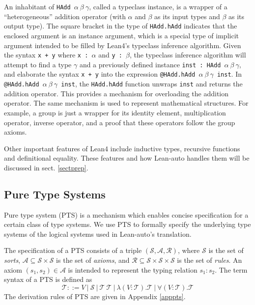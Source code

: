   \noindent An inhabitant of \texttt{HAdd $\alpha \ \beta \ \gamma$}, called a
  typeclass instance, is a wrapper of a ``heterogeneous'' addition operator (with $\alpha$ and $\beta$ as its input types and
  $\beta$ as its output type). The square bracket in the type of \texttt{HAdd.hAdd}
  indicates that the enclosed argument is an instance argument, which is a special type
  of implicit argument intended to be filled by Lean4's typeclass inference algorithm.
  Given the syntax \texttt{x + y} where \texttt{x : $\alpha$} and \texttt{y : $\beta$},
  the typeclass inference algorithm will attempt to find a type $\gamma$ and a previously
  defined instance \texttt{inst : HAdd $\alpha \ \beta \ \gamma$}, and elaborate the
  syntax \texttt{x + y} into the expression \texttt{@HAdd.hAdd $\alpha \ \beta \ \gamma$ inst}.
  In \texttt{@HAdd.hAdd $\alpha \ \beta \ \gamma$ inst}, the \texttt{HAdd.hAdd} function
  unwraps \texttt{inst} and returns the addition operator. This provides a mechanism
  for overloading the addition operator. The same mechanism is used to represent mathematical
  structures. For example, a group is just a wrapper for its identity element, multiplication
  operator, inverse operator, and a proof that these operators follow the group axioms.

  Other important features of Lean4 include inductive types, recursive functions
  and definitional equality. These features and how Lean-auto handles them will be discussed
  in sect. \ref{sectprep}.

\subsection{Pure Type Systems}\label{sectpts}

  Pure type system (PTS) \cite{LambdaWithType} is a mechanism which enables concise specification
  for a certain class of type systems. We use PTS to formally specify the underlying type systems
  of the logical systems used in Lean-auto's translation.

  The specification of a PTS consists of a triple $(\mathcal{S}, \mathcal{A}, \mathcal{R})$,
  where $\mathcal{S}$ is the set of \textit{sorts}, $\mathcal{A} \subseteq \mathcal{S} \times \mathcal{S}$ is
  the set of \textit{axioms}, and $\mathcal{R} \subseteq \mathcal{S} \times \mathcal{S} \times \mathcal{S}$
  is the set of \textit{rules}. An axiom $(s_1, s_2) \in \mathcal{A}$ is intended to represent
  the typing relation $s_1 : s_2$. The term syntax of a PTS is defined as
  $$\mathcal{T} ::= V \ | \ \mathcal{S} \ | \ \mathcal{T} \ \mathcal{T} \ |
    \ \lambda (V : \mathcal{T}). \mathcal{T} \ | \ \forall (V : \mathcal{T}). \mathcal{T}$$
  \noindent The derivation rules of PTS are given in Appendix \ref{apppts}.

